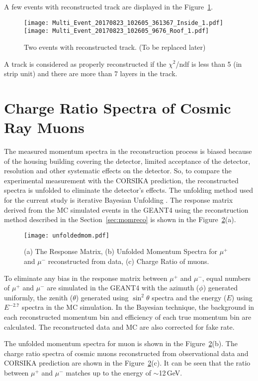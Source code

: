 A few events with reconstructed track are displayed in the
Figure~\ref{fig:eventdisplay}.
\begin{figure}[h]
  \texttt{[image: Multi\_Event\_20170823\_102605\_361367\_Inside\_1.pdf]}
  \texttt{[image: Multi\_Event\_20170823\_102605\_9676\_Roof\_1.pdf]}
  \caption{Two events with reconstructed track. (To be replaced later)}
  \label{fig:eventdisplay}
\end{figure}
A track is considered as properly reconstructed if the $\chi^{2}$/ndf
is less than 5 (in strip unit) and there are more than 7 layers in
the track.

\section{Charge Ratio Spectra of Cosmic Ray Muons}
\label{section:multiresult}
The measured momentum spectra in the reconstruction process is biased
because of the housing building covering the detector, limited
acceptance of the detector, resolution and other systematic effects
on the detector. So, to compare the experimental measurement with the
CORSIKA prediction, the reconstructed spectra is unfolded to eliminate
the detector's effects.
The unfolding method used for the current study is iterative
Bayesian Unfolding \cite{bayesian}.
The response matrix derived from the MC simulated events in the
GEANT4 using the reconstruction method described in the
Section~\ref{sec:momreco} is shown in the
Figure~\ref{fig:unfolddata}(a).
\begin{figure}[h]
  \texttt{[image: unfoldedmom.pdf]}
  \caption{(a) The Response Matrix, (b) Unfolded Momentum Spectra for
    $\mu^{+}$ and $\mu^{-}$ reconstructed from data, (c) Charge Ratio
    of muons.}
  \label{fig:unfolddata}
\end{figure}
To eliminate any bias in the response matrix between $\mu^{+}$ and
$\mu^{-}$, equal numbers of $\mu^{+}$ and $\mu^{-}$ are simulated in
the GEANT4 with the azimuth ($\phi$) generated uniformly, the zenith
($\theta$) generated using $\sin^{2} \theta$ spectra and the energy
($E$) using $E^{-2.7}$ spectra in the MC simulation.
In the Bayesian technique, the background in each reconstructed
momentum bin and efficiency of each true momentum bin are calculated.
The reconstructed data and MC are also corrected for fake rate.

The unfolded momentum spectra for muon is shown in the
Figure~\ref{fig:unfolddata}(b). The charge ratio spectra of cosmic
muons reconstructed from observational data and CORSIKA prediction
are shown in the Figure~\ref{fig:unfolddata}(c). It can be seen that
the ratio between $\mu^{+}$ and $\mu^{-}$ matches up to the energy
of $\sim$12\,GeV.

